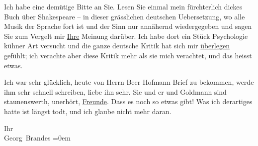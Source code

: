 \pstart
           Ich habe eine demütige Bitte an Sie. Lesen Sie einmal mein fürchterlich dickes Buch über Shakespeare – in dieser grässlichen deutschen Uebersetzung, wo
               alle Musik der Sprache fort ist und der Sinn nur annähernd wiedergegeben und sagen
               Sie zum Vergelt mir \uline{Ihre} Meinung darüber. Ich habe
               dort ein Stück Psychologie kühner Art versucht und die ganze deutsche Kritik hat sich
               mir \uline{überlegen} gefühlt; ich verachte aber diese Kritik
               mehr als sie mich verachtet, und das heisst etwas.\pend
           
\pstart
           Ich war sehr glücklich, heute von Herrn Beer
                  Hofmann Brief zu bekommen, werde ihm sehr schnell schreiben, liebe ihn sehr.
               Sie und er und Goldmann sind staunenswerth,
               unerhört, \uline{Freunde}. Dass es noch so etwas gibt! Was
               ich derartiges hatte ist längst todt, und ich glaube nicht mehr daran.\pend
           
\pstart
           Ihr{\\[\baselineskip]}\spacefill\mbox{Georg Brandes}\pend
           \leftskip=0em{}\endnumbering{}  
      